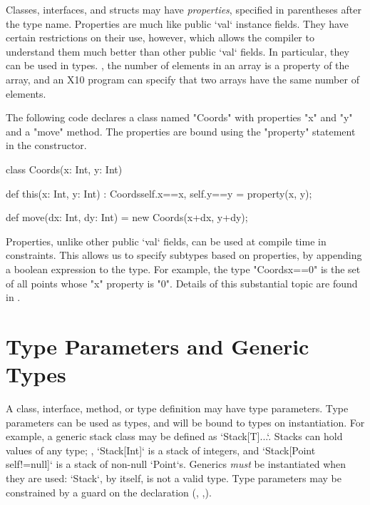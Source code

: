 Classes, interfaces, and structs may have {\em properties}, specified in
parentheses after the type name. Properties are much like public \xcd`val`
instance fields. They have certain restrictions on their use, however, which
allows the compiler to understand them much better than other public \xcd`val`
fields. In particular, they can be used in types.  \Eg, the number of elements
in an array is a property of the array, and an X10 program can specify that
two arrays have the same number of elements.

\begin{ex}
The
following code declares a class named \xcd"Coords" with properties
\xcd"x" and \xcd"y" and a \xcd"move" method. The properties are bound
using the \xcd"property" statement in the constructor.

\begin{xten}
class Coords(x: Int, y: Int) { 
  def this(x: Int, y: Int) :
    Coords{self.x==x, self.y==y} = { 
    property(x, y); 
  } 

  def move(dx: Int, dy: Int) = new Coords(x+dx, y+dy); 
}
\end{xten}
\end{ex}
Properties, unlike other public \xcd`val` fields, can be used  
at compile time in {constraints}. This allows us
to specify subtypes based on properties, by appending a boolean expression to
the type. For example, the type \xcd"Coords{x==0}" is the set of all points
whose \xcd"x" property is \xcd"0".  Details of this substantial topic are
found in .



\section{Type Parameters and Generic Types}
\label{TypeParameters}

\label{Generics}

A class, interface, method, or type definition  may have type
parameters.  Type parameters can be used as types, and will be bound to types
on instantiation.  For example, a generic stack class may be defined as 
\xcd`Stack[T]{...}`.  Stacks can hold values of any type; \eg, 
\xcd`Stack[Int]` is a stack of integers, and 
\xcd`Stack[Point {self!=null}]` is a stack of non-null \xcd`Point`s.
Generics {\em must} be instantiated when they are used: \xcd`Stack`, by
itself, is not a valid type.
Type parameters may be constrained by a guard on the declaration
(,
,).

